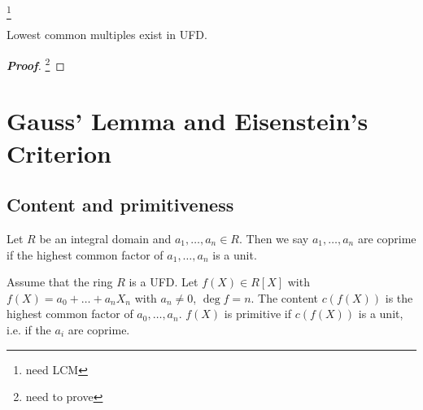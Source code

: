 \begin{definition}
\footnote{need LCM}
\end{definition}

\begin{proposition}%
Lowest common multiples exist in UFD.
\end{proposition}

\begin{proof}[\bf Proof]
\footnote{need to prove}
\end{proof}






\section{Gauss' Lemma and Eisenstein's Criterion}


\subsection{Content and primitiveness}

\begin{definition}\label{def:coprime_ring}
Let $R$ be an integral domain and $a_1,\dots,a_n\in R$. Then we say $a_1,\dots,a_n$ are coprime if the highest common factor of $a_1,\dots,a_n$ is a unit.
\end{definition}

\begin{definition}
Assume that the ring $R$ is a UFD. Let $f(X)\in R[X]$ with $f(X) = a_0 + \dots + a_nX_n$ with $a_n \neq 0$, $\deg f = n$. The content $c(f(X))$ is the highest common factor of $a_0,\dots, a_n$. $f(X)$ is primitive if $c(f(X))$ is a unit, i.e. if the $a_i$ are coprime.%
\end{definition}



